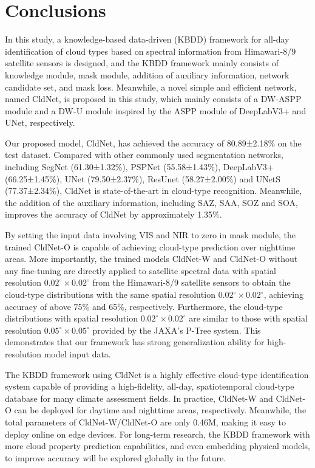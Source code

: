 \documentclass[review]{elsarticle}
\begin{document}
\section{Conclusions}
\label{section:5}
In this study, a knowledge-based data-driven (KBDD) framework for all-day identification of cloud types based on spectral information from Himawari-8/9 satellite sensors is designed, and the KBDD framework mainly consists of knowledge module, mask module, addition of auxiliary information, network candidate set, and mask loss.
Meanwhile, a novel simple and efficient network, named CldNet, is proposed in this study, which mainly consists of a DW-ASPP module and a DW-U module inspired by the ASPP module of DeepLabV3+ and UNet, respectively.

Our proposed model, CldNet, has achieved the accuracy of 80.89±2.18\% on the test dataset.
Compared with other commonly used segmentation networks, including SegNet (61.30±1.32\%), PSPNet (55.58±1.43\%), DeepLabV3+ (66.25±1.45\%), UNet (79.50±2.37\%), ResUnet (58.27±2.00\%) and UNetS (77.37±2.34\%), CldNet is state-of-the-art in cloud-type recognition.
Meanwhile, the addition of the auxiliary information, including SAZ, SAA, SOZ and SOA, improves the accuracy of CldNet by approximately 1.35\%.

By setting the input data involving VIS and NIR to zero in mask module, the trained CldNet-O is capable of achieving cloud-type prediction over nighttime areas.
More importantly, the trained models CldNet-W and CldNet-O without any fine-tuning are directly applied to satellite spectral data with spatial resolution $\mathrm{0.02^{\circ}\times0.02^{\circ}}$ from the Himawari-8/9 satellite sensors to obtain the cloud-type distributions with the same spatial resolution $\mathrm{0.02^{\circ}\times0.02^{\circ}}$, achieving accuracy of above 75\% and 65\%, respectively.
Furthermore, the cloud-type distributions with spatial resolution $\mathrm{0.02^{\circ}\times0.02^{\circ}}$ are similar to those with spatial resolution $\mathrm{0.05^{\circ}\times0.05^{\circ}}$ provided by the JAXA's P-Tree system.
This demonstrates that our framework has strong generalization ability for high-resolution model input data.

The KBDD framework using CldNet is a highly effective cloud-type identification system capable of providing a high-fidelity, all-day, spatiotemporal cloud-type database for many climate assessment fields.
In practice, CldNet-W and CldNet-O can be deployed for daytime and nighttime areas, respectively.
Meanwhile, the total parameters of CldNet-W/CldNet-O are only 0.46M, making it easy to deploy online on edge devices.
For long-term research, the KBDD framework with more cloud property prediction capabilities, and even embedding physical models, to improve accuracy will be explored globally in the future.
\end{document}
